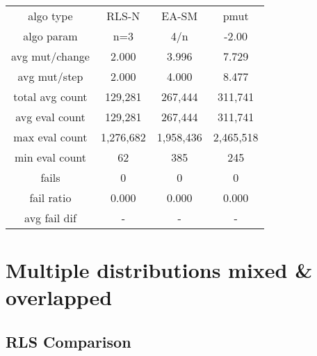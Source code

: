 \begin{tabular}[h]{cccc}
algo type&               RLS-N&        EA-SM&         pmut\\
algo param&                n=3&          4/n&        -2.00\\
avg mut/change&          2.000&        3.996&        7.729\\
avg mut/step&            2.000&        4.000&        8.477\\
\hline
total avg count&       129,281&      267,444&      311,741\\
avg eval count&        129,281&      267,444&      311,741\\
max eval count&      1,276,682&    1,958,436&    2,465,518\\
min eval count&             62&          385&          245\\
\hline
fails&                       0&            0&            0\\
fail ratio&              0.000&        0.000&        0.000\\
avg fail dif&                -&            -&            -\\
\end{tabular}


\section{Multiple distributions mixed \& overlapped}

\subsection{RLS Comparison}



